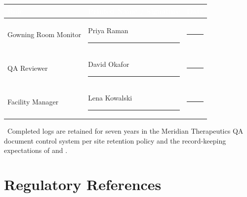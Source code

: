 \begin{center}
\renewcommand{\arraystretch}{1.6}
\begin{tabularx}{\linewidth}{|Y|Y|c|}
\hline
{}
\textcolor{white}{\bfseries Role} & \textcolor{white}{\bfseries Printed Name / Signature} &
\textcolor{white}{\bfseries Date} \\
\hline
Gowning Room Monitor & Priya Raman \, \rule{4.2cm}{0.4pt} & \rule{2.0cm}{0.4pt} \\
\hline
{}
QA Reviewer & David Okafor \, \rule{4.2cm}{0.4pt} & \rule{2.0cm}{0.4pt} \\
\hline
Facility Manager & Lena Kowalski \, \rule{4.2cm}{0.4pt} & \rule{2.0cm}{0.4pt} \\
\hline
\end{tabularx}
\end{center}

\vspace{4pt}
{\small\color{steelgray}\faLock\ Completed logs are retained for seven years in the
Meridian Therapeutics QA document control system per site retention policy and the
record-keeping expectations of \cite{fda-aseptic} and \cite{usp797}.}

\section*{Regulatory References}
\renewcommand{\refname}{}
\vspace{-1.6em}
\begingroup
\small


\endgroup
